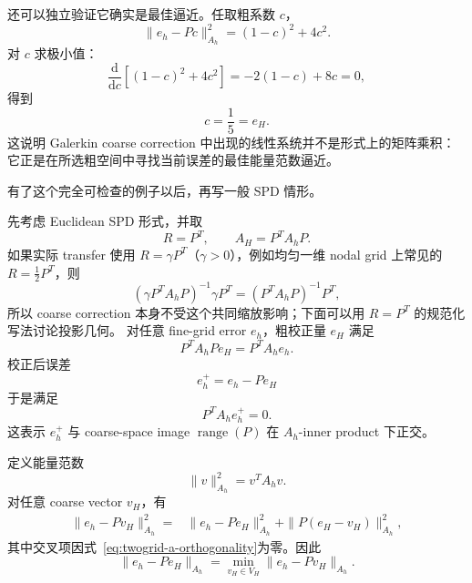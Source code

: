 还可以独立验证它确实是最佳逼近。任取粗系数 $c$，
\begin{equation}
\|e_h-Pc\|_{A_h}^2
=
(1-c)^2+4c^2.
\end{equation}
对 $c$ 求极小值：
\begin{equation}
\frac{\mathrm d}{\mathrm dc}
\left[(1-c)^2+4c^2\right]
=
-2(1-c)+8c
=
0,
\end{equation}
得到
\begin{equation}
c=\frac15=e_H.
\end{equation}
这说明 Galerkin coarse correction 中出现的线性系统并不是形式上的矩阵乘积：它正是在所选粗空间中寻找当前误差的最佳能量范数逼近。

有了这个完全可检查的例子以后，再写一般 SPD 情形。

先考虑 Euclidean SPD 形式，并取
\begin{equation}
R=P^T,
\qquad
A_H=P^TA_hP.
\label{eq:twogrid-symmetric-galerkin}
\end{equation}
如果实际 transfer 使用 $R=\gamma P^T$（$\gamma>0$），例如均匀一维 nodal grid 上常见的 $R=\frac12P^T$，则
\begin{equation}
(\gamma P^TA_hP)^{-1}\gamma P^T
=(P^TA_hP)^{-1}P^T,
\end{equation}
所以 coarse correction 本身不受这个共同缩放影响；下面可以用 $R=P^T$ 的规范化写法讨论投影几何。
对任意 fine-grid error $e_h$，粗校正量 $e_H$ 满足
\begin{equation}
P^TA_hP e_H=P^TA_he_h.
\label{eq:twogrid-galerkin-normal-equation}
\end{equation}
校正后误差
\begin{equation}
e_h^+=e_h-Pe_H
\end{equation}
于是满足
\begin{equation}
\boxed{
P^TA_he_h^+=0.
}
\label{eq:twogrid-a-orthogonality}
\end{equation}
这表示 $e_h^+$ 与 coarse-space image $\operatorname{range}(P)$ 在 $A_h$-inner product 下正交。

定义能量范数
\begin{equation}
\|v\|_{A_h}^2=v^TA_hv.
\end{equation}
对任意 coarse vector $v_H$，有
\begin{align}
\|e_h-Pv_H\|_{A_h}^2
={}&\|e_h-Pe_H\|_{A_h}^2
+\|P(e_H-v_H)\|_{A_h}^2,
\end{align}
其中交叉项因式~\eqref{eq:twogrid-a-orthogonality}为零。因此
\begin{equation}
\boxed{
\|e_h-Pe_H\|_{A_h}
=\min_{v_H\in V_H}\|e_h-Pv_H\|_{A_h}.
}
\label{eq:twogrid-energy-best-approximation}
\end{equation}

